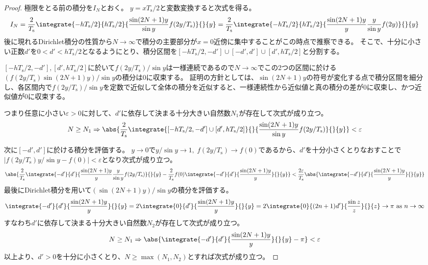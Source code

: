 				\begin{proof}
					\quad\par
					極限をとる前の積分を$I_N$とおく。
					$y = x T_\text{s}/2$と変数変換すると次式を得る。
					\[
						I_N = \frac{2}{T_\text{s}}\integrate{-h T_\text{s}/2}{h T_\text{s}/2}{\frac{\sin(2N+1)y}{\sin y}f(2y/T_\text{s})}{}{y} = \frac{2}{T_\text{s}}\integrate{-h T_\text{s}/2}{h T_\text{s}/2}{\frac{\sin(2N+1)y}{y}\frac{y}{\sin y}f(2y)}{}{y}
					\]
					後に現れるDirichlet積分の性質から$N\to\infty$で積分の主要部分が$x=0$近傍に集中することがこの時点で推察できる。
					そこで、十分に小さい正数$d'$を$0<d'<h T_\text{s}/2$となるようにとり、積分区間を$[-h T_\text{s}/2,-d']\cup[-d',d']\cup[d',h T_\text{s}/2]$と分割する。
					\par
					$[-h T_\text{s}/2,-d'], [d',h T_\text{s}/2]$に於いて$f(2y/T_\text{s})/\sin y$は一様連続であるので$N\to\infty$でこの2つの区間に於ける$(f(2y/T_\text{s})\sin(2N+1)y)/\sin y$の積分は0に収束する。
					証明の方針としては、$\sin(2N+1)y$の符号が変化する点で積分区間を細分し、各区間内で$f(2y/T_\text{s})/\sin y$を定数で近似して全体の積分を近似すると、一様連続性から近似値と真の積分の差が0に収束し、かつ近似値が0に収束する。
					\par
					つまり任意に小さい$\varepsilon>0$に対して、$d'$に依存して決まる十分大きい自然数$N_1$が存在して次式が成り立つ。
					\[
						N\geq N_1 \Rightarrow \abs{\frac{2}{T_\text{s}}\integrate{[-h T_\text{s}/2,-d']\cup[d',h T_\text{s}/2]}{}{\frac{\sin(2N+1)y}{\sin y}f(2y/T_\text{s})}{}{y}}<\varepsilon
					\]
					\par
					次に$[-d',d']$に於ける積分を評価する。
					$y\to 0$で$y/\sin y\to 1,\;f(2y/T_\text{s})\to f(0)$であるから、$d'$を十分小さくとりなおすことで$|f(2y/T_\text{s})y/\sin y - f(0)| < \varepsilon$となり次式が成り立つ。
					\[
						\abs{\frac{2}{T_\text{s}}\integrate{-d'}{d'}{\frac{\sin(2N+1)y}{y}\frac{y}{\sin y}f(2y/T_\text{s})}{}{y} - \frac{2}{T_\text{s}}f(0)\integrate{-d'}{d'}{\frac{\sin(2N+1)y}{y}}{}{y}} < \frac{2\varepsilon}{T_\text{s}}\abs{\integrate{-d'}{d'}{\frac{\sin(2N+1)y}{y}}{}{y}}
					\]
					最後にDirichlet積分を用いて$(\sin(2N+1)y)/\sin y$の積分を評価する。
					\[
						\integrate{-d'}{d'}{\frac{\sin(2N+1)y}{y}}{}{y} = 2\integrate{0}{d'}{\frac{\sin(2N+1)y}{y}}{}{y} = 2\integrate{0}{(2n+1)d'}{\frac{\sin z}{z}}{}{z} \to \pi \text{ as } n\to\infty
					\]
					すなわち$d'$に依存して決まる十分大きい自然数$N_2$が存在して次式が成り立つ。
					\[ N\geq N_1 \Rightarrow \abs{\integrate{-d'}{d'}{\frac{\sin(2N+1)y}{y}}{}{y} - \pi} < \varepsilon \]
					以上より、$d'>0$を十分に小さくとり、$N\geq\max(N_1,N_2)$とすれば次式が成り立つ。

\end{proof}
